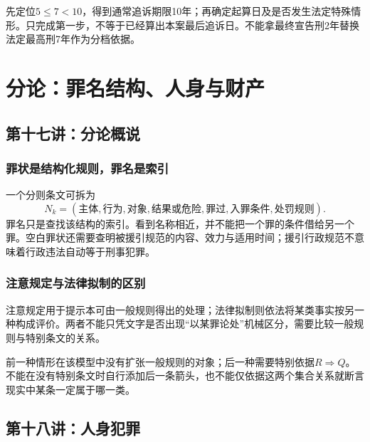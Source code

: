 先定位$5\le7<10$，得到通常追诉期限10年；再确定起算日及是否发生法定特殊情形。只完成第一步，不等于已经算出本案最后追诉日。不能拿最终宣告刑2年替换法定最高刑7年作为分档依据。


\chapter{分论：罪名结构、人身与财产}

\section{第十七讲：分论概说}
\subsection{罪状是结构化规则，罪名是索引}
一个分则条文可拆为
\[
 N_k=(\text{主体},\text{行为},\text{对象},\text{结果或危险},
 \text{罪过},\text{入罪条件},\text{处罚规则}).
\]
罪名只是查找该结构的索引。看到名称相近，并不能把一个罪的条件借给另一个罪。空白罪状还需要查明被援引规范的内容、效力与适用时间；援引行政规范不意味着行政违法自动等于刑事犯罪。

\subsection{注意规定与法律拟制的区别}
注意规定用于提示本可由一般规则得出的处理；法律拟制则依法将某类事实按另一种构成评价。两者不能只凭文字是否出现“以某罪论处”机械区分，需要比较一般规则与特别条文的关系。

前一种情形在该模型中没有扩张一般规则的对象；后一种需要特别依据$R\Rightarrow Q$。不能在没有特别条文时自行添加后一条箭头，也不能仅依据这两个集合关系就断言现实中某条一定属于哪一类。


\section{第十八讲：人身犯罪}
